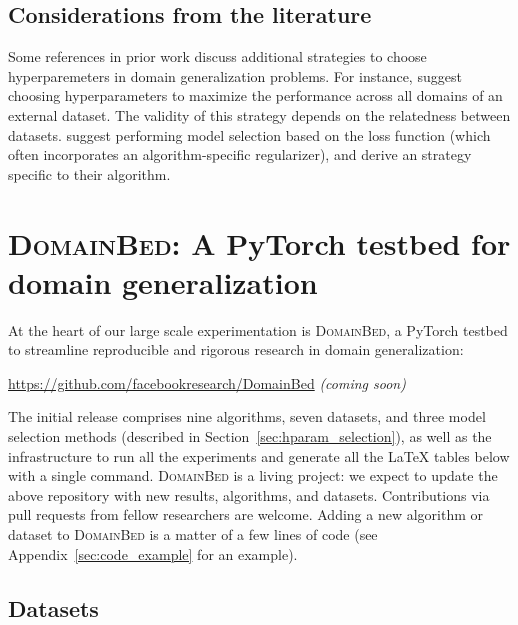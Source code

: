 \documentclass{article}
\newcommand{\domainbed}{\textsc{DomainBed}\xspace}
\begin{document}
\subsection{Considerations from the literature}

Some references in prior work discuss additional strategies to choose hyperparemeters in domain generalization problems.
For instance, \citet[Appendix B.1]{krueger2020out} suggest choosing hyperparameters to maximize the performance across all domains of an external dataset.
The validity of this strategy depends on the relatedness between datasets.
\citet[Section 5.3.2]{albuquerque2019a} suggest performing model selection based on the loss function (which often incorporates an algorithm-specific regularizer), and \citet[Section 3]{d2018domain} derive an strategy specific to their algorithm.

\section{\domainbed: A PyTorch testbed for domain generalization}
\label{sec:benchmark}

At the heart of our large scale experimentation is \domainbed, a PyTorch \citep{paszke2019pytorch} testbed to streamline reproducible and rigorous research in domain generalization:
\begin{center}
    \url{https://github.com/facebookresearch/DomainBed} \textit{(coming soon)}
\end{center}

The initial release comprises nine algorithms, seven datasets, and three model selection methods (described in Section~\ref{sec:hparam_selection}), as well as the infrastructure to run all the experiments and generate all the \LaTeX{} tables below with a single command. 
\domainbed is a living project: we expect to update the above repository with new results, algorithms, and datasets. Contributions via pull requests from fellow researchers are welcome.
Adding a new algorithm or dataset to \domainbed is a matter of a few lines of code (see Appendix~\ref{sec:code_example} for an example).

\subsection{Datasets}
\label{sec:datasets}
\end{document}
